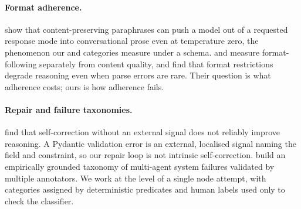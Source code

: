\paragraph{Format adherence.}
\citet{liu2026paraconsist} show that content-preserving paraphrases can
push a model out of a requested response mode into conversational prose
even at temperature zero, the phenomenon our  and
 categories measure under a schema.
\citet{xia2024fofo} and \citet{zhou2023ifeval} measure format-following
separately from content quality, and \citet{tam2024speak} find that
format restrictions degrade reasoning even when parse errors are rare.
Their question is what adherence costs; ours is how adherence fails.

\paragraph{Repair and failure taxonomies.}
\citet{huang2024selfcorrect} find that self-correction without an
external signal does not reliably improve reasoning. A Pydantic
validation error is an external, localised signal naming the field and
constraint, so our repair loop is not intrinsic self-correction.
\citet{cemri2025mast} build an empirically grounded taxonomy of
multi-agent system failures validated by multiple annotators. We work at
the level of a single node attempt, with categories assigned by
deterministic predicates and human labels used only to check the
classifier.

